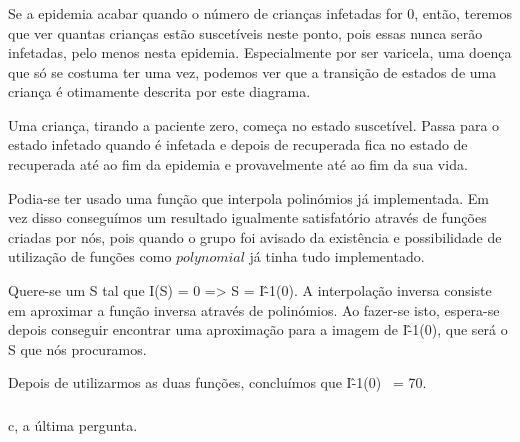 \documentclass[portuguese, a4paper]{article}
\begin{document}
		\subsubsection{}
		\par
		Se a epidemia acabar quando o número de crianças infetadas for 0, então, teremos
		que ver quantas crianças estão suscetíveis neste ponto, pois essas nunca serão infetadas, pelo menos nesta
		epidemia. Especialmente por ser varicela, uma doença que só se costuma ter uma vez,
		podemos ver que a transição de estados de uma criança
		é otimamente descrita por este diagrama.

		Uma criança, tirando a paciente zero, começa no estado suscetível. Passa
		para o estado infetado quando é infetada e depois de recuperada fica no estado de recuperada até ao fim da
		epidemia e provavelmente até ao fim da sua vida.


		Podia-se ter usado uma função que interpola polinómios já implementada.
		Em vez disso conseguímos um resultado igualmente satisfatório através de funções criadas por nós, pois
		quando o grupo foi avisado da existência e possibilidade de utilização de funções como $polynomial$ %
		já tinha tudo implementado.

		Quere-se um S tal que I(S) = 0 => S = I\^-1(0).
		A interpolação inversa consiste em aproximar a função inversa através de polinómios.
		Ao fazer-se isto, espera-se depois conseguir encontrar uma aproximação
		para a imagem de I\^-1(0), 
		que será o S que nós procuramos.
		\par
		Depois de utilizarmos as duas funções, concluímos que I\^-1(0) ~= 70.
		
		\subsubsection{}
		\par
		c, a última pergunta.
\end{document}
